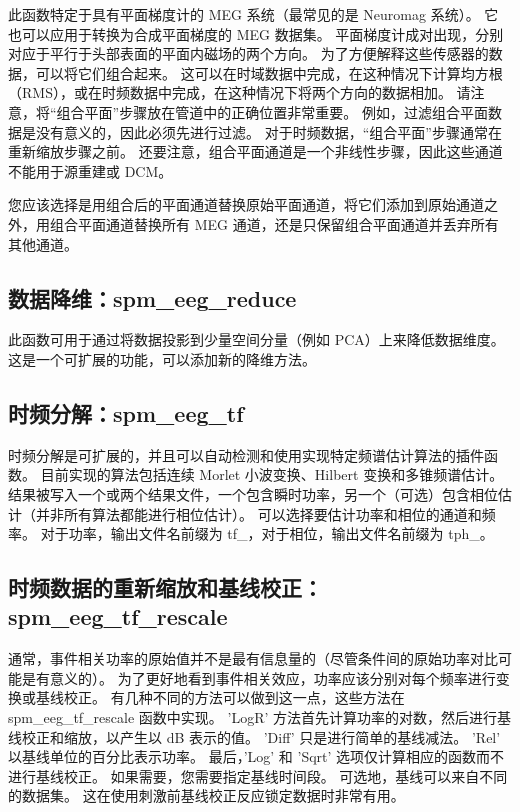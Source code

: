 此函数特定于具有平面梯度计的 MEG 系统（最常见的是 Neuromag 系统）。
它也可以应用于转换为合成平面梯度的 MEG 数据集。
平面梯度计成对出现，分别对应于平行于头部表面的平面内磁场的两个方向。
为了方便解释这些传感器的数据，可以将它们组合起来。
这可以在时域数据中完成，在这种情况下计算均方根（RMS），或在时频数据中完成，在这种情况下将两个方向的数据相加。
请注意，将“组合平面”步骤放在管道中的正确位置非常重要。
例如，过滤组合平面数据是没有意义的，因此必须先进行过滤。
对于时频数据，“组合平面”步骤通常在重新缩放步骤之前。
还要注意，组合平面通道是一个非线性步骤，因此这些通道不能用于源重建或 DCM。

您应该选择是用组合后的平面通道替换原始平面通道，将它们添加到原始通道之外，用组合平面通道替换所有 MEG 通道，还是只保留组合平面通道并丢弃所有其他通道。


\subsection{数据降维：spm\_eeg\_reduce}

此函数可用于通过将数据投影到少量空间分量（例如 PCA）上来降低数据维度。这是一个可扩展的功能，可以添加新的降维方法。


\subsection{时频分解：spm\_eeg\_tf}

时频分解是可扩展的，并且可以自动检测和使用实现特定频谱估计算法的插件函数。
目前实现的算法包括连续 Morlet 小波变换、Hilbert 变换和多锥频谱估计。
结果被写入一个或两个结果文件，一个包含瞬时功率，另一个（可选）包含相位估计（并非所有算法都能进行相位估计）。
可以选择要估计功率和相位的通道和频率。
对于功率，输出文件名前缀为 tf\_，对于相位，输出文件名前缀为 tph\_。


\subsection{时频数据的重新缩放和基线校正：spm\_eeg\_tf\_rescale}

通常，事件相关功率的原始值并不是最有信息量的（尽管条件间的原始功率对比可能是有意义的）。
为了更好地看到事件相关效应，功率应该分别对每个频率进行变换或基线校正。
有几种不同的方法可以做到这一点，这些方法在 spm\_eeg\_tf\_rescale 函数中实现。
'LogR' 方法首先计算功率的对数，然后进行基线校正和缩放，以产生以 dB 表示的值。
'Diff' 只是进行简单的基线减法。
'Rel' 以基线单位的百分比表示功率。
最后，'Log' 和 'Sqrt' 选项仅计算相应的函数而不进行基线校正。
如果需要，您需要指定基线时间段。
可选地，基线可以来自不同的数据集。
这在使用刺激前基线校正反应锁定数据时非常有用。


